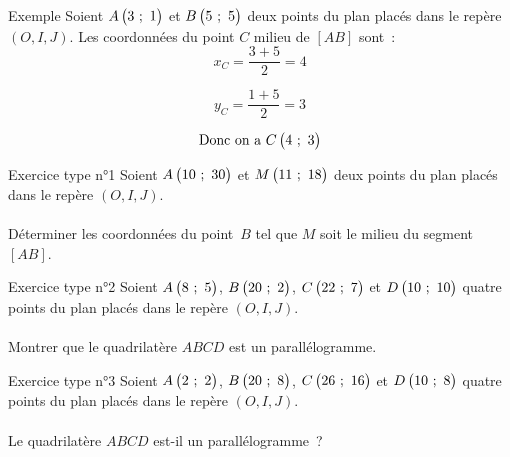 \documentclass[
    a4paper,
    12pt,
    mathserif,
    handout
    ]{beamer}
\begin{document}
\begin{frame}
	\begin{block}{Exemple}
	Soient $A\begin{pmatrix}3~;~1\end{pmatrix}$ et $B\begin{pmatrix}5~;~5\end{pmatrix}$ deux points du plan placés dans le repère $(O,I,J)$. Les coordonnées du point $C$ milieu de $[AB]$ sont~: \\
	
	\[x_C = \dfrac{3+5}{2} = 4\]
	
	\[y_C = \dfrac{1+5}{2} = 3\]
	
	\[\text{Donc on a }C\begin{pmatrix}4~;~3\end{pmatrix}\]	
	\end{block}
\end{frame}


\begin{frame}
	\begin{block}{Exercice type n°1}
	Soient $A\begin{pmatrix}10~;~30\end{pmatrix}$ et $M\begin{pmatrix}11~;~18\end{pmatrix}$ deux points du plan placés dans le repère $(O,I,J)$.\\~\\ Déterminer les coordonnées du point~$B$ tel que $M$ soit le milieu du segment $[AB]$.\\
	\end{block}
\end{frame}

\begin{frame}
	\begin{block}{Exercice type n°2}
	Soient $A\begin{pmatrix}8~;~5\end{pmatrix}$, $B\begin{pmatrix}20~;~2\end{pmatrix}$, $C\begin{pmatrix}22~;~7\end{pmatrix}$ et $D\begin{pmatrix}10~;~10\end{pmatrix}$ quatre points du plan placés dans le repère $(O,I,J)$.\\~\\ Montrer que le quadrilatère $ABCD$ est un parallélogramme.
	\end{block}
\end{frame}

\begin{frame}
	\begin{block}{Exercice type n°3}
	Soient $A\begin{pmatrix}2~;~2\end{pmatrix}$, $B\begin{pmatrix}20~;~8\end{pmatrix}$, $C\begin{pmatrix}26~;~16\end{pmatrix}$ et $D\begin{pmatrix}10~;~8\end{pmatrix}$ quatre points du plan placés dans le repère $(O,I,J)$.\\~\\ Le quadrilatère $ABCD$ est-il un parallélogramme~?
	\end{block}
\end{frame}
\end{document}
